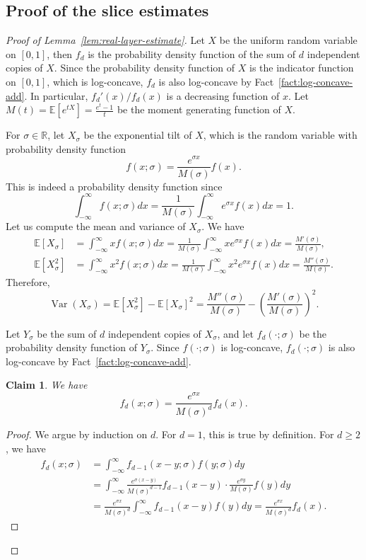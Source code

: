 \documentclass{article}
\newcommand{\paren}[1]{\left( #1 \right)}
\newcommand{\EE}{\mathbb{E}}
\newcommand{\RR}{\mathbb{R}}
\newtheorem{claim}[thm]{Claim}
\theoremstyle{definition}
\DeclareMathOperator{\Var}{Var}
\begin{document}
\subsection{Proof of the slice estimates}

\begin{proof}[Proof of Lemma~\ref{lem:real-layer-estimate}]
    Let $X$ be the uniform random variable on $[0,1]$, then $f_d$ is the probability density function of the sum of $d$ independent copies of $X$. Since the probability density function of $X$ is the indicator function on $[0,1]$, which is log-concave, $f_d$ is also log-concave by Fact~\ref{fact:log-concave-add}. In particular, $f_d'(x)/f_d(x)$ is a decreasing function of $x$. Let $M(t)=\EE[e^{tX}]=\frac{e^t-1}{t}$ be the moment generating function of $X$.

    For $\sigma\in\RR$, let $X_\sigma$ be the exponential tilt of $X$, which is the random variable with probability density function
    \[f(x;\sigma) = \frac{e^{\sigma x}}{M(\sigma)}f(x).\]
    This is indeed a probability density function since
    \[\int_{-\infty}^\infty f(x;\sigma)dx = \frac{1}{M(\sigma)}\int_{-\infty}^{\infty} e^{\sigma x}f(x)dx = 1.\]
    Let us compute the mean and variance of $X_\sigma$. We have
    \begin{align*}
        \EE[X_\sigma] &= \int_{-\infty}^\infty xf(x;\sigma)dx = \frac{1}{M(\sigma)}\int_{-\infty}^\infty xe^{\sigma x}f(x)dx = \frac{M'(\sigma)}{M(\sigma)}, \\
        \EE[X_\sigma^2] &= \int_{-\infty}^\infty x^2f(x;\sigma)dx = \frac{1}{M(\sigma)}\int_{-\infty}^\infty x^2e^{\sigma x}f(x)dx = \frac{M''(\sigma)}{M(\sigma)}.
    \end{align*}
    Therefore, 
    \[\Var(X_\sigma) = \EE[X_\sigma^2] - \EE[X_\sigma]^2 = \frac{M''(\sigma)}{M(\sigma)} - \paren{\frac{M'(\sigma)}{M(\sigma)}}^2.\]

    Let $Y_\sigma$ be the sum of $d$ independent copies of $X_\sigma$, and let $f_d(\cdot;\sigma)$ be the probability density function of $Y_\sigma$. Since $f(\cdot;\sigma)$ is log-concave, $f_d(\cdot;\sigma)$ is also log-concave by Fact~\ref{fact:log-concave-add}. 

    \begin{claim}
        We have
        \[f_d(x;\sigma) = \frac{e^{\sigma x}}{M(\sigma)^d}f_d(x).\]
    \end{claim}
    \begin{proof}
        We argue by induction on $d$. For $d=1$, this is true by definition. For $d\geq 2$, we have
        \begin{align*}
            f_d(x;\sigma) &= \int_{-\infty}^\infty f_{d-1}(x-y;\sigma)f(y;\sigma)dy \\
            &= \int_{-\infty}^\infty \frac{e^{\sigma (x-y)}}{M(\sigma)^{d-1}}f_{d-1}(x-y) \cdot \frac{e^{\sigma y}}{M(\sigma)}f(y) dy \\
            &= \frac{e^{\sigma x}}{M(\sigma)^d} \int_{-\infty}^\infty f_{d-1}(x-y)f(y) dy = \frac{e^{\sigma x}}{M(\sigma)^d}f_d(x).
        \end{align*}
    \end{proof}


\end{proof}
\end{document}
